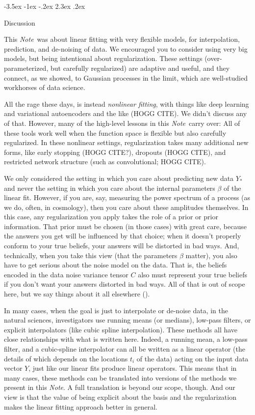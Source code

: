 \documentclass[12pt,letterpaper]{article}
\makeatletter
\renewcommand\section{\@startsection {section}{1}{\z@}%
  {-3.5ex \@plus -1ex \@minus -.2ex}%
  {2.3ex \@plus.2ex}%
  {\raggedright\normalfont\Large\bfseries}}
\newcommand{\documentname}{\textsl{Note}}
\makeatother
\begin{document}
\section{Discussion}\label{sec:discussion}

This \documentname\ was about linear fitting with very flexible models, for interpolation, prediction, and de-noising of data.
We encouraged you to consider using very big models, but being intentional about regularization.
These settings (over-parameterized, but carefully regularized) are adaptive and useful, and they connect, as we showed, to Gaussian processes in the limit, which are well-studied workhorses of data science.

All the rage these days, is instead \emph{nonlinear fitting}, with things like deep learning and variational autoencoders and the like (HOGG CITE).
We didn't discuss any of that.
However, many of the high-level lessons in this \documentname\ carry over:
All of these tools work well when the function space is flexible but also carefully regularized.
In these nonlinear settings, regularization takes many additional new forms, like early stopping (HOGG CITE?), dropouts (HOGG CITE), and restricted network structure (such as convolutional; HOGG CITE).

We only considered the setting in which you care about predicting new data $Y_\ast$ and never the setting in which you care about the internal parameters $\beta$ of the linear fit.
However, if you are, say, measuring the power spectrum of a process (as we do, often, in cosmology), then you care about these amplitudes themselves.
In this case, any regularization you apply takes the role of a prior or prior information.
That prior must be chosen (in those cases) with great care, because the answers you get will be influenced by that choice; when it doesn't properly conform to your true beliefs, your answers will be distorted in bad ways.
And, technically, when you take this view (that the parameters $\beta$ matter), you also have to get serious about the noise model on the data.
That is, the beliefs encoded in the data noise variance tensor $C$ also must represent your true beliefs if you don't want your answers distorted in bad ways.
All of that is out of scope here, but we say things about it all elsewhere (\citealt{fitting}).

In many cases, when the goal is just to interpolate or de-noise data, in the natural sciences, investigators use running means (or medians), low-pass filters, or explicit interpolators (like cubic spline interpolation).
These methods all have close relationships with what is written here.
Indeed, a running mean, a low-pass filter, and a cubic-spline interpolator can all be written as a linear operator (the details of which depends on the locations $t_i$ of the data) acting on the input data vector $Y$, just like our linear fits produce linear operators.
This means that in many cases, these methods can be translated into versions of the methods we present in this \documentname.
A full translation is beyond our scope, though.
And our view is that the value of being explicit about the basis and the regularization makes the linear fitting approach better in general.
\end{document}
